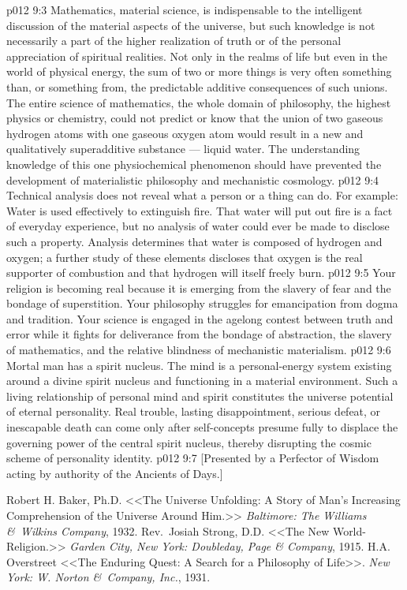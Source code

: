 \vs p012 9:3 Mathematics, material science, is indispensable to the intelligent discussion of the material aspects of the universe, but such knowledge is not necessarily a part of the higher realization of truth or of the personal appreciation of spiritual realities. Not only in the realms of life but even in the world of physical energy, the sum of two or more things is very often something  than, or something  from, the predictable additive consequences of such unions. The entire science of mathematics, the whole domain of philosophy, the highest physics or chemistry, could not predict or know that the union of two gaseous hydrogen atoms with one gaseous oxygen atom would result in a new and qualitatively superadditive substance --- liquid water. The understanding knowledge of this one physiochemical phenomenon should have prevented the development of materialistic philosophy and mechanistic cosmology.
\vs p012 9:4 Technical analysis does not reveal what a person or a thing can do. For example: Water is used effectively to extinguish fire. That water will put out fire is a fact of everyday experience, but no analysis of water could ever be made to disclose such a property. Analysis determines that water is composed of hydrogen and oxygen; a further study of these elements discloses that oxygen is the real supporter of combustion and that hydrogen will itself freely burn.
\vs p012 9:5 Your religion is becoming real because it is emerging from the slavery of fear and the bondage of superstition. Your philosophy struggles for emancipation from dogma and tradition. Your science is engaged in the agelong contest between truth and error while it fights for deliverance from the bondage of abstraction, the slavery of mathematics, and the relative blindness of mechanistic materialism.
\vs p012 9:6 \pc Mortal man has a spirit nucleus. The mind is a personal\hyp{}energy system existing around a divine spirit nucleus and functioning in a material environment. Such a living relationship of personal mind and spirit constitutes the universe potential of eternal personality. Real trouble, lasting disappointment, serious defeat, or inescapable death can come only after self\hyp{}concepts presume fully to displace the governing power of the central spirit nucleus, thereby disrupting the cosmic scheme of personality identity.
\vsetoff
\vs p012 9:7 [Presented by a Perfector of Wisdom acting by authority of the Ancients of Days.]
\quizlink
\begin{thebibliography}{100}
Robert H. Baker, Ph.D.
{<<The Universe Unfolding: A Story of Man's Increasing Comprehension of the Universe Around Him.>>}
{\em Baltimore: The Williams \&\ Wilkins Company}, 1932.
Rev.~Josiah Strong, D.D.
{<<The New World\hyp{}Religion.>>}
{\em Garden City, New York: Doubleday, Page \& Company}, 1915.
H.A. Overstreet
{<<The Enduring Quest: A Search for a Philosophy of Life>>.}
{\em New York: W. Norton \&\ Company, Inc.}, 1931.
\end{thebibliography}
